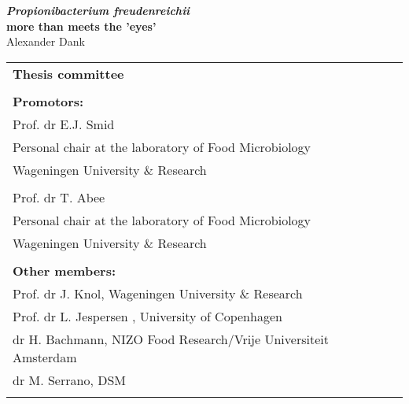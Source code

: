 \newpage
\thispagestyle{empty}
\begin{center}
\Huge{\textbf{\textit{Propionibacterium freudenreichii}}} \\
\Huge{\textbf{more than meets the 'eyes'}} \\
\vspace*{1cm}
\vspace*{1cm}
\vspace*{\fill}
\large{Alexander Dank} \\
\end{center}

\newpage
\thispagestyle{empty}
\vspace*{\fill}
\begin{tabular}{l}
    \textbf{Thesis committee}                                                                 \\  
                                                                                              \\  
    \textbf{Promotors:}                                                                        \\  
    Prof. dr E.J. Smid                                                                         \\  
    Personal chair at the laboratory of Food Microbiology                                  \\  
    Wageningen University \& Research                                                                    \\  
                                                                                                             \\  
    Prof. dr T. Abee                                                                  \\  
    Personal chair at the laboratory of Food Microbiology             \\  
    Wageningen University \& Research                                                                     \\  
                                                                                              \\  

    \textbf{Other members:}                                                                   \\  
    Prof. dr J. Knol, Wageningen University \& Research                                              \\  
    Prof. dr L. Jespersen , University of Copenhagen                                                       \\  
    dr H. Bachmann, NIZO Food Research/Vrije Universiteit Amsterdam                                                       \\  
    dr M. Serrano, DSM                                                     \\  
                                                                                              \\  


\end{tabular}
